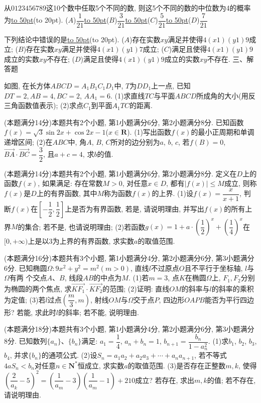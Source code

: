 \documentclass[10pt,a4paper]{article}
\newcommand{\blank}[1]{\underline{\hbox to #1pt{}}}
\newcommand{\bracket}[1]{(\hbox to #1pt{})}
\begin{document}
\item 从$0123456789$这10个数中任取5个不同的数, 则这5个不同的数的中位数为4的概率为\blank{50}\bracket{20}.
($A$)$\dfrac 1{21}$\blank{50}($B$)$\dfrac 3{21}$\blank{50}($C$)$\dfrac 5{21}$\blank{50}($D$)$\dfrac 7{21}$
\item 下列结论中错误的是\blank{50}\bracket{20}.
($A$)存在实数$xy$满足并使得$4(x1)(y1)9$成立;
($B$)存在实数$xy$满足并使得$4(x1)(y1)7$成立;
($C$)满足且使得$4(x1)(y1)9$成立的实数$xy$不存在;
($D$)满足且使得$4(x1)(y1)9$成立的实数$xy$不存在.
三、解答题
\item 如图, 在长方体$ABCD=A_1B_1C_1D_1$中, $T$为$DD_1$上一点, 已知$DT=2,AB=4,BC=2$, $AA_1=6$.
(1)求直线$TC$与平面$ABCD$所成角的大小(用反三角函数值表示);
(2)求点$C_1$到平面$A_1TC$的距离.
 
\item (本题满分14分)本题共有2个小题, 第1小题满分6分, 第2小题满分8分.
已知函数$f(x)=\sqrt 3\sin 2x+\cos 2x-1$($x\in \mathbf{R}$).
(1)写出函数$f(x)$的最小正周期和单调递增区间;
(2)在\triangle $ABC$中, 角$A$, $B$, $C$所对的边分别为$a$, $b$, $c$, 若$f(B)=0$, $\overrightarrow{BA}\cdot \overrightarrow{BC}=\dfrac 32$, 且$a+c=4$, 求$b$的值.
\item (本题满分14分)本题共有2个小题, 第1小题满分6分, 第2小题满分8分.
定义在$D$上的函数$f(x)$, 如果满足: 存在常数$M>0$, 对任意$x\in D$, 都有$|f(x)|\le M$成立, 则称$f(x)$是$D$上的有界函数, 其中$M$称为函数$f(x)$的上界.
(1)设$f(x)=\dfrac x{x+1}$, 判断$f(x)$在$[-\dfrac 12, \dfrac 12]$上是否为有界函数, 若是, 请说明理由, 并写出$f(x)$的所有上界$M$的集合; 若不是, 也请说明理由;
(2)若函数$g(x)=1+a\cdot (\dfrac 12)^x+(\dfrac 14)^x$在$[0, +\infty)$上是以$3$为上界的有界函数, 求实数$a$的取值范围.
 
\item (本题满分16分)本题共有3个小题, 第1小题满分4分, 第2小题满分6分, 第3小题满分6分.
已知椭圆$\Omega :9x^2+y^2=m^2(m>0)$, 直线$l$不过原点$O$且不平行于坐标轴, $l$与$\Omega$有两 个交点$A$、$B$, 线段$AB$的中点为$M$.
(1)若$m=3$, 点$K$在椭圆$\Omega$上, $F_1,F_2$分别为椭圆的两个焦点, 求$\overrightarrow{KF_1}\cdot \overrightarrow{KF_2}$的范围;
(2)证明: 直线$OM$的斜率与$l$的斜率的乘积为定值;
(3)若$l$过点$(\dfrac m3,m)$, 射线$OM$与$\Omega$交于点$P$, 四边形$OAPB$能否为平行四边形?  若能, 求此时$l$的斜率; 若不能, 说明理由.
\item (本题满分18分)本题共有3个小题, 第1小题满分4分, 第2小题满分6分, 第3小题满分8分.
已知数列$\{a_n\}$、$\{b_n\}$满足: $a_1=\dfrac 14$, $a_n+b_n=1$, $b_{n+1}=\dfrac{b_n}{1-a_n^2}$.
(1)求$b_1$, $b_2$, $b_3$, $b_4$, 并求$\{b_n\}$的通项公式.
(2)设$S_n=a_1a_2+a_2a_3+\cdots +a_na_{n+1}$, 若不等式$4aS_n<b_n$对任意$n\in \mathbf{N}^*$恒成立, 求实数$a$的取值范围.
(3)是否存在正整数$m,k$, 使得$(\dfrac 2{a_k}-5)^2=(\dfrac 1{a_m}-3)(\dfrac 1{a_m}-1)+210$成立? 若存在, 求出$m,k$的值; 若不存在, 请说明理由.
\end{document}
